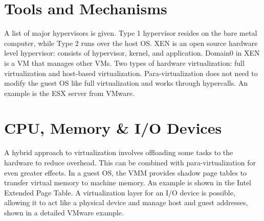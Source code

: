 

\section{Tools and Mechanisms}

A list of major hypervisors is given. Type 1 hypervisor resides on the
bare metal computer, while Type 2 runs over the host OS. XEN is an open
source hardware level hypervisor: consists of hypervisor, kernel, and
application. Domain0 in XEN is a VM that manages other VMs. Two types of
hardware virtualization: full virtualization and host-based
virtualization. Para-virtualization does not need to modify the guest OS
like full virtualization and works through hypercalls. An example is the
ESX server from VMware.



\section{CPU, Memory \& I/O Devices}

A hybrid approach to virtualization involves offloading some tasks to
the hardware to reduce overhead. This can be combined with
para-virtualization for even greater effects. In a guest OS, the VMM
provides shadow page tables to transfer virtual memory to machine
memory. An example is shown in the Intel Extended Page Table. A
virtualization layer for an I/O device is possible, allowing it to act
like a physical device and manage host and guest addresses, shown in a
detailed VMware example.



